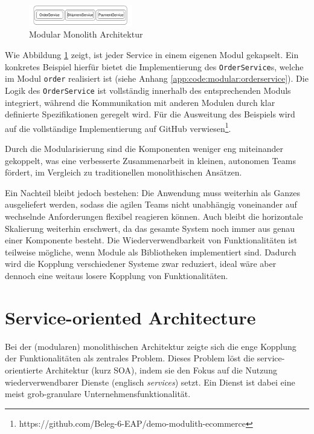 \documentclass[acmtog]{acmart}
\begin{document}
\begin{figure}[h!]
  \centering
  \includegraphics[width=0.4\textwidth]{images/mono/mono-example.pdf}
  \caption{Modular Monolith Architektur}
  \label{fig:modular-mono}
\end{figure}

Wie Abbildung \ref{fig:modular-mono} zeigt, ist jeder Service in einem eigenen Modul gekapselt.
Ein konkretes Beispiel hierfür bietet die Implementierung des \texttt{OrderService}s, welche im Modul \texttt{order}
realisiert ist (siehe Anhang \ref{app:code:modular:orderservice}). Die Logik des \texttt{OrderService} ist vollständig
innerhalb des entsprechenden Moduls integriert, während die Kommunikation mit anderen Modulen durch klar definierte
Spezifikationen geregelt wird.
Für die Ausweitung des Beispiels wird auf die vollständige Implementierung auf GitHub verwiesen\footnote{https://github.com/Beleg-6-EAP/demo-modulith-ecommerce}.

Durch die Modularisierung sind die Komponenten weniger eng miteinander gekoppelt, was eine
verbesserte Zusammenarbeit in kleinen, autonomen Teams fördert, im Vergleich zu traditionellen
monolithischen Ansätzen.

Ein Nachteil bleibt jedoch bestehen: Die Anwendung muss weiterhin als Ganzes ausgeliefert werden,
sodass die agilen Teams nicht unabhängig voneinander auf wechselnde Anforderungen flexibel reagieren können.
Auch bleibt die horizontale Skalierung weiterhin erschwert, da das gesamte System noch immer aus genau einer Komponente besteht.
Die Wiederverwendbarkeit von Funktionalitäten ist teilweise mögliche, wenn Module als Bibliotheken implementiert sind.
Dadurch wird die Kopplung verschiedener Systeme zwar reduziert, ideal wäre aber dennoch eine weitaus losere Kopplung von Funktionalitäten.

\section{Service-oriented Architecture}
\label{sec:soa}
Bei der (modularen) monolithischen Architektur zeigte sich die enge Kopplung der Funktionalitäten als zentrales Problem.
Dieses Problem löst die service-orientierte Architektur (kurz SOA), indem sie den Fokus auf die Nutzung wiederverwendbarer Dienste (englisch \textit{services}) setzt.
Ein Dienst ist dabei eine meist grob-granulare Unternehmensfunktionalität.
\end{document}
